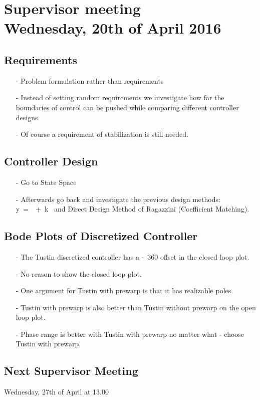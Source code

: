 

\renewcommand\chaptername{KAPITEL}
\renewcommand\contentsname{Indhold}
\renewcommand\figurename{Figur}
\renewcommand\tablename{Tabel}

\section*{Supervisor meeting\\ \small Wednesday, 20th of April 2016}

\subsection{Requirements}
\begin{itemize}
  \item[-] Problem formulation rather than requirements
  \item[-] Instead of setting random requirements we investigate how far the boundaries of control can be pushed while comparing different controller designs.
  \item[-] Of course a requirement of stabilization is still needed.
\end{itemize}

\subsection{Controller Design}
\begin{itemize}
  \item[-] Go to State Space
  \item[-] Afterwards go back and investigate the previous design methods: \si{y = \theta + k \omega} and Direct Design Method of Ragazzini (Coefficient Matching).
\end{itemize}

\subsection{Bode Plots of Discretized Controller}
\begin{itemize}
  \item[-] The Tustin discretized controller has a \si{-360^\circ} offset in the closed loop plot.
  \item[-] No reason to show the closed loop plot.
  \item[-] One argument for Tustin with prewarp is that it has realizable poles.
  \item[-] Tustin with prewarp is also better than Tustin without prewarp on the open loop plot.
  \item[-] Phase range is better with Tustin with prewarp no matter what - choose Tustin with prewarp.
\end{itemize}

\subsection{Next Supervisor Meeting}
Wednesday, 27th of April at 13.00

